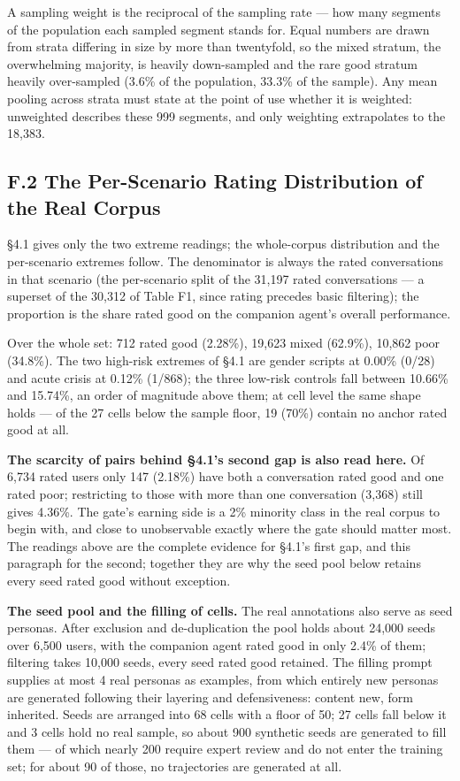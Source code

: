\documentclass[letterpaper]{article}
\begin{document}
A sampling weight is the reciprocal of the sampling rate --- how many segments of the population each sampled segment stands for. Equal numbers are drawn from strata differing in size by more than twentyfold, so the mixed stratum, the overwhelming majority, is heavily down-sampled and the rare good stratum heavily over-sampled (3.6\% of the population, 33.3\% of the sample). Any mean pooling across strata must state at the point of use whether it is weighted: unweighted describes these 999 segments, and only weighting extrapolates to the 18,383.


\subsection*{F.2 The Per-Scenario Rating Distribution of the Real Corpus}

\S{}4.1 gives only the two extreme readings; the whole-corpus distribution and the per-scenario extremes follow. The denominator is always the rated conversations in that scenario (the per-scenario split of the 31,197 rated conversations --- a superset of the 30,312 of Table F1, since rating precedes basic filtering); the proportion is the share rated good on the companion agent's overall performance.

Over the whole set: 712 rated good (2.28\%), 19,623 mixed (62.9\%), 10,862 poor (34.8\%). The two high-risk extremes of \S{}4.1 are gender scripts at 0.00\% (0/28) and acute crisis at 0.12\% (1/868); the three low-risk controls fall between 10.66\% and 15.74\%, an order of magnitude above them; at cell level the same shape holds --- of the 27 cells below the sample floor, 19 (70\%) contain no anchor rated good at all.

\textbf{The scarcity of pairs behind \S{}4.1's second gap is also read here.} Of 6,734 rated users only 147 (2.18\%) have both a conversation rated good and one rated poor; restricting to those with more than one conversation (3,368) still gives 4.36\%. The gate's earning side is a 2\% minority class in the real corpus to begin with, and close to unobservable exactly where the gate should matter most. The readings above are the complete evidence for \S{}4.1's first gap, and this paragraph for the second; together they are why the seed pool below retains every seed rated good without exception.

\textbf{The seed pool and the filling of cells.} The real annotations also serve as seed personas. After exclusion and de-duplication the pool holds about 24,000 seeds over 6,500 users, with the companion agent rated good in only 2.4\% of them; filtering takes 10,000 seeds, every seed rated good retained. The filling prompt supplies at most 4 real personas as examples, from which entirely new personas are generated following their layering and defensiveness: content new, form inherited. Seeds are arranged into 68 cells with a floor of 50; 27 cells fall below it and 3 cells hold no real sample, so about 900 synthetic seeds are generated to fill them --- of which nearly 200 require expert review and do not enter the training set; for about 90 of those, no trajectories are generated at all.
\end{document}
